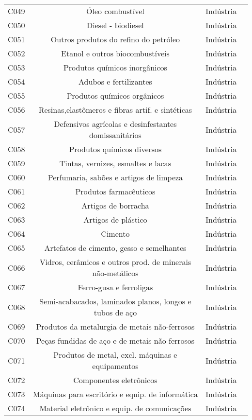 \begin{apendicesenv}
\begin{small}
\begin{center}
\begin{longtable}{lccc}
				C049 & Óleo combustível & Indústria \\
				C050 & Diesel - biodiesel & Indústria \\
				C051 & Outros produtos do refino do petróleo & Indústria \\
				C052 & Etanol e outros biocombustíveis & Indústria \\
				C053 & Produtos químicos inorgânicos & Indústria \\
				C054 & Adubos e fertilizantes & Indústria \\
				C055 & Produtos químicos orgânicos & Indústria \\
				C056 & Resinas,elastômeros e fibras artif. e sintéticas & Indústria \\
				C057 & Defensivos agrícolas e desinfestantes domissanitários & Indústria \\
				C058 & Produtos químicos diversos & Indústria \\
				C059 & Tintas, vernizes, esmaltes e lacas & Indústria \\
				C060 & Perfumaria, sabões e artigos de limpeza & Indústria \\
				C061 & Produtos farmacêuticos & Indústria \\
				C062 & Artigos de borracha & Indústria \\
				C063 & Artigos de plástico & Indústria \\
				C064 & Cimento & Indústria \\
				C065 & Artefatos de cimento, gesso e semelhantes & Indústria \\
				C066 & Vidros, cerâmicos e outros prod. de minerais não-metálicos & Indústria \\
				C067 & Ferro-gusa e ferroligas & Indústria \\
				C068 & Semi-acabacados, laminados planos, longos e tubos de aço & Indústria \\
				C069 & Produtos da metalurgia de metais não-ferrosos & Indústria \\
				C070 & Peças fundidas de aço e de metais não ferrosos & Indústria \\
				C071 & Produtos de metal, excl. máquinas e equipamentos & Indústria \\
				C072 & Componentes eletrônicos & Indústria \\
				C073 & Máquinas para escritório e equip. de informática & Indústria \\
				C074 & Material eletrônico e equip. de comunicações & Indústria \\

\end{longtable}
\end{center}
\end{small}
\end{apendicesenv}
